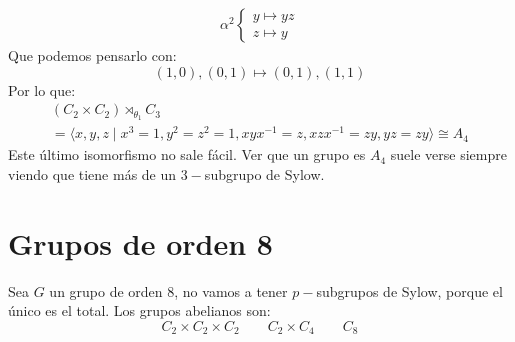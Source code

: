 \begin{itemize}
\begin{itemize}
\begin{gather*}
                    \alpha^2\left\{\begin{array}{l}
                        y\longmapsto yz \\
                        z \longmapsto y
                    \end{array}\right.
                \end{gather*}
                Que podemos pensarlo con:
                \begin{equation*}
                    (1,0), (0,1) \longmapsto (0,1), (1,1)
                \end{equation*}
                Por lo que:
                \begin{multline*}
                    (C_2\times C_2)\rtimes_{\theta_1} C_3 \\ = \langle x,y,z\mid x^3=1, y^2 = z^2 = 1, xyx^{-1}=z, xzx^{-1}=zy, yz = zy \rangle  \cong A_4
                \end{multline*}
                Este último isomorfismo no sale fácil. Ver que un grupo es $A_4$ suele verse siempre viendo que tiene más de un $3-$subgrupo de Sylow.
        \end{itemize}
\end{itemize}

\section{Grupos de orden 8}
\noindent
Sea $G$ un grupo de orden 8, no vamos a tener $p-$subgrupos de Sylow, porque el único es el total. Los grupos abelianos son:
\begin{equation*}
    C_2\times C_2\times C_2 \qquad C_2\times C_4 \qquad C_8
\end{equation*}
